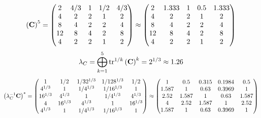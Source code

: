 \documentclass[10pt,a4paper]{article}
\begin{document}
	\[
		\left(\bold{C}\right)^{5} = 
		\begin{pmatrix}
			{{2}}{} & {{4}} / {{3}} & {1}{} & {1} / {{2}} & {{4}} / {{3}} \\
			{{4}}{} & {{2}}{} & {{2}}{} & {1}{} & {{2}}{} \\
			{{8}}{} & {{4}}{} & {{2}}{} & {{2}}{} & {{4}}{} \\
			{{12}}{} & {{8}}{} & {{4}}{} & {{2}}{} & {{8}}{} \\
			{{4}}{} & {{2}}{} & {{2}}{} & {1}{} & {{2}}{} \\
		\end{pmatrix}
		\approx
		\begin{pmatrix}
			2        & 1.333    & 1        & 0.5      & 1.333    \\
			4        & 2        & 2        & 1        & 2        \\
			8        & 4        & 2        & 2        & 4        \\
			12       & 8        & 4        & 2        & 8        \\
			4        & 2        & 2        & 1        & 2        \\
		\end{pmatrix}
	\]
	\[
		\lambda_{C} =  \bigoplus ^{5} _{k = 1} \operatorname{tr} ^{1 / k} \left( \bold{C} \right)^k = {{2^ {1 / 3}}}{}\approx 1.26
	\]
	\[
		\left(\lambda_{C}^{-1}\bold{C}\right)^* = 
		\begin{pmatrix}
			{1}{} & {1} / {{2}} & {1} / {{32^ {1 / 3}}} & {1} / {{128^ {1 / 3}}} & {1} / {{2}} \\
			{{4^ {1 / 3}}}{} & {1}{} & {1} / {{4^ {1 / 3}}} & {1} / {{16^ {1 / 3}}} & {1}{} \\
			{{16^ {1 / 3}}}{} & {{4^ {1 / 3}}}{} & {1}{} & {1} / {{4^ {1 / 3}}} & {{4^ {1 / 3}}}{} \\
			{{4}}{} & {{16^ {1 / 3}}}{} & {{4^ {1 / 3}}}{} & {1}{} & {{16^ {1 / 3}}}{} \\
			{{4^ {1 / 3}}}{} & {1}{} & {1} / {{4^ {1 / 3}}} & {1} / {{16^ {1 / 3}}} & {1}{} \\
		\end{pmatrix}
		\approx
		\begin{pmatrix}
			1        & 0.5      & 0.315    & 0.1984   & 0.5      \\
			1.587    & 1        & 0.63     & 0.3969   & 1        \\
			2.52     & 1.587    & 1        & 0.63     & 1.587    \\
			4        & 2.52     & 1.587    & 1        & 2.52     \\
			1.587    & 1        & 0.63     & 0.3969   & 1        \\
		\end{pmatrix}
	\]
\end{document}
